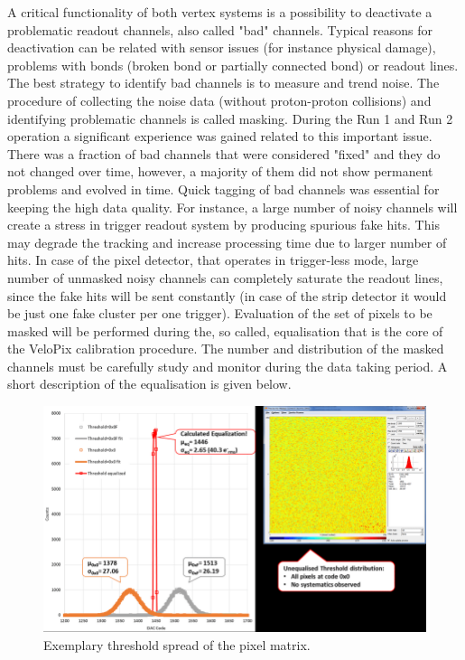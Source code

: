 A critical functionality of both vertex systems is a possibility to deactivate a problematic readout channels, also called "bad" channels. Typical reasons for deactivation can be related with sensor issues (for instance physical damage), problems with bonds (broken bond or partially connected bond) or readout lines. The best strategy to identify bad channels is to measure and trend noise.
The procedure of collecting the noise data (without proton-proton collisions) and identifying problematic channels is called masking. During the Run 1 and Run 2 operation a significant experience was gained related to this important issue. There was a fraction of bad channels that were considered "fixed" and they do not changed over time, however, a majority of them did not show permanent problems and evolved in time. Quick tagging of bad channels was essential for keeping the high data quality. For instance, a large number of noisy channels will create a stress in trigger readout system by producing spurious fake hits. This may degrade the tracking and increase processing time due to larger number of hits. In case of the pixel detector, that operates in trigger-less mode, large number of unmasked noisy channels can completely saturate the readout lines, since the fake hits will be sent constantly (in case of the strip detector it would be just one fake cluster per one trigger). Evaluation of the set of pixels to be masked will be performed during the, so called, equalisation that is the core of the VeloPix calibration procedure. The number and distribution of the masked channels must be carefully study and monitor during the data taking period. A short description of the equalisation is given below.





\begin{figure}
    \centering
    \includegraphics[width=0.7\linewidth]{figures/chapter2/Threshold-spread-in-the-pixel-matrix.png}
    \caption{Exemplary threshold spread of the pixel matrix.}
    \label{plot:velopix_thresholding}
\end{figure}

